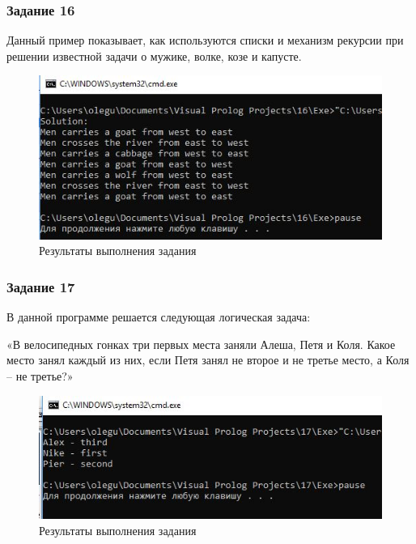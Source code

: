 \documentclass[14pt,a4paper,report]{report}
\begin{document}
\subsubsection{Задание 16}

Данный пример показывает, как используются списки и механизм рекурсии при решении известной задачи о мужике, волке, козе и капусте.



\begin{figure}[h!]
	\centering
	\includegraphics[scale = 0.9]{images/d16.png}
	\caption{Результаты выполнения задания}
\end{figure}
\clearpage
\subsubsection{Задание 17}

В данной программе решается следующая логическая задача:

«В велосипедных гонках три первых места заняли Алеша, Петя и Коля. Какое место занял каждый из них, если Петя занял не второе и не третье место, а Коля – не третье?»



\begin{figure}[h!]
	\centering
	\includegraphics[scale = 0.9]{images/d17.png}
	\caption{Результаты выполнения задания}
\end{figure}
\clearpage
\end{document}
